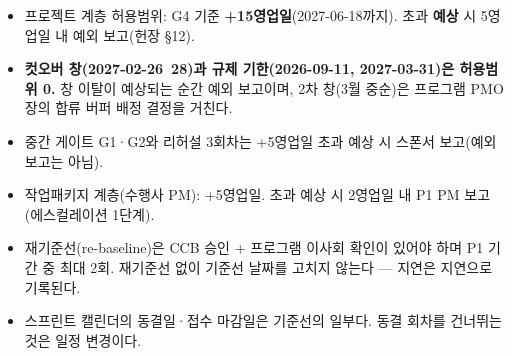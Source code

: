 \documentclass[10pt,a4paper]{article}
\begin{document}
\begin{fieldbox}
\ifwbblank
{}\par\vspace{4mm}
\par\vspace{4mm}
\par\vspace{4mm}
\par\vspace{4mm}
\par\vspace{4mm}
\par
\else
\begin{itemize}
\item 프로젝트 계층 허용범위: G4 기준 \textbf{+15영업일}(2027-06-18까지). 초과 \textbf{예상} 시 5영업일 내 예외 보고(헌장 §12).
\item \textbf{컷오버 창(2027-02-26~28)과 규제 기한(2026-09-11, 2027-03-31)은 허용범위 0.} 창 이탈이 예상되는 순간 예외 보고이며, 2차 창(3월 중순)은 프로그램 PMO장의 합류 버퍼 배정 결정을 거친다.
\item 중간 게이트 G1·G2와 리허설 3회차는 +5영업일 초과 예상 시 스폰서 보고(예외 보고는 아님).
\item 작업패키지 계층(수행사 PM): +5영업일. 초과 예상 시 2영업일 내 P1 PM 보고(에스컬레이션 1단계).
\item 재기준선(re-baseline)은 CCB 승인 + 프로그램 이사회 확인이 있어야 하며 P1 기간 중 최대 2회. 재기준선 없이 기준선 날짜를 고치지 않는다 — 지연은 지연으로 기록된다.
\item 스프린트 캘린더의 동결일·접수 마감일은 기준선의 일부다. 동결 회차를 건너뛰는 것은 일정 변경이다.
\end{itemize}\fi
\end{fieldbox}
\end{document}
